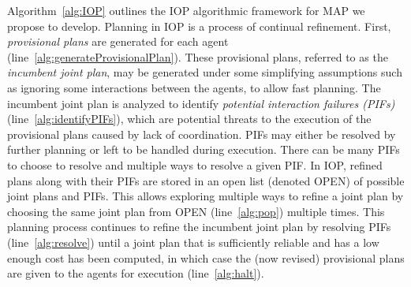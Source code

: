 \documentclass[11pt]{article}
\begin{document}
Algorithm~\ref{alg:IOP} outlines the IOP algorithmic framework for MAP we propose to develop. Planning in IOP is a process of continual refinement.  
First, {\em provisional plans} are generated for each agent  (line~\ref{alg:generateProvisionalPlan}). These provisional plans, referred to as the {\em incumbent joint plan}, may be generated under some simplifying assumptions such as ignoring some interactions between the agents, to allow fast planning. The incumbent joint plan is analyzed to identify {\em potential interaction failures (PIFs)} (line~\ref{alg:identifyPIFs}), which are potential threats to the execution of the provisional plans caused by lack of coordination. 
PIFs may either be resolved by further planning or left to be handled during execution. 
There can be many PIFs to choose to resolve and multiple ways to resolve a given PIF. In IOP, refined plans along with their PIFs are stored in an open list (denoted OPEN) of possible joint plans and PIFs. This allows exploring multiple ways to refine a joint plan by choosing the same joint plan from OPEN (line~\ref{alg:pop}) multiple times.  
This planning process continues to refine the incumbent joint plan by resolving PIFs (line~\ref{alg:resolve}) until a joint plan that is sufficiently reliable and has a low enough cost has been computed, in which case the (now revised) provisional plans are given to the agents for execution (line~\ref{alg:halt}). 



\end{document}
